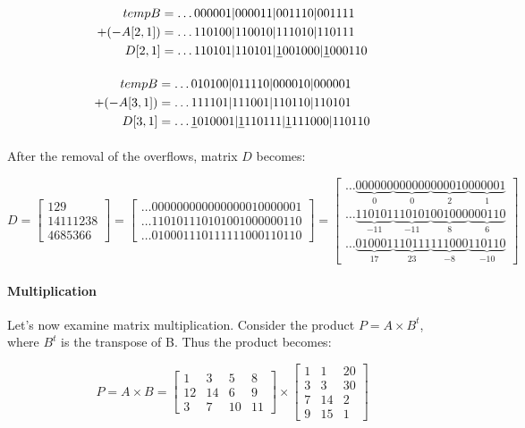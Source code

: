 \documentclass[12pt]{article}
\begin{document}
\begin{align*}
	tempB &= \ldots000001|000011|001110|001111\\
+(-A[2,1])&= \ldots110100|110010|111010|110111\\ 
D[2,1]	  &= \ldots110101|110101|\sout{1}001000|\sout{1}000110
\end{align*}

\begin{align*}
tempB	  &= \ldots010100|011110|000010|000001 \\
+(-A[3,1])&= \ldots111101|111001|110110|110101\\ 
D[3,1]	  &= \ldots\sout{1}010001|\sout{1}110111|\sout{1}111000|110110
\end{align*}

After the removal of the overflows, matrix $D$ becomes:

\begin{equation}
	D = \begin{bmatrix}
			129\\ 
			14111238\\ 
			4685366
		\end{bmatrix} 
        =
        \begin{bmatrix}
   			\ldots000000000000000010000001 \\
			\ldots110101110101001000000110 \\
			\ldots010001110111111000110110
		\end{bmatrix}
        =
        \begin{bmatrix}
 \ldots\underbrace{000000}_{0}\underbrace{000000}_{0}\underbrace{000010}_{2}
\underbrace{000001}_{1} \\ 			 
 \ldots\underbrace{110101}_{-11}\underbrace{110101}_{-11}\underbrace{001000}_{8}
\underbrace{000110}_{6} \\
 \ldots\underbrace{010001}_{17}\underbrace{110111}_{23}\underbrace{111000}_{-8}
\underbrace{110110}_{-10}
		\end{bmatrix}
\end{equation}

\paragraph{Multiplication}
Let's now examine matrix multiplication. Consider the product $P = A \times
B^{t}$, where $B^t$ is the transpose of B. Thus the product becomes:

\begin{equation}
	P = A \times B = \begin{bmatrix}
			1 & 3 & 5 & 8\\ 
			12 &14  & 6 & 9\\ 
			3 & 7 & 10 & 11
		\end{bmatrix}
        \times
		\begin{bmatrix}
			1 & 1  & 20\\ 
            3 & 3  & 30\\
            7 & 14 & 2\\
            9 & 15 & 1
		\end{bmatrix}
\end{equation}
\end{document}
